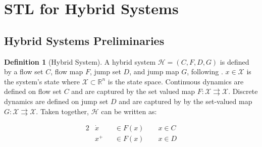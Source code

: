 \documentclass{article}
\theoremstyle{definition}
\newtheorem{definition}{Definition}[section]
\begin{document}

\section{STL for Hybrid Systems}

\subsection{Hybrid Systems Preliminaries }

\begin{definition}[Hybrid System]
    A hybrid system $\mathcal{H} = (C,F,D,G)$ is defined by a flow set $C$, flow map
    $F$, jump set $D$, and jump map $G$, following \cite{hybrid_2012}. $x\in
    \mathcal{X}$ is the system's state where $\mathcal{X}\subset\mathbb{R}^n$ is the state
    space. Continuous dynamics are defined on flow set $C$ and are captured by the set valued map
    $F:\mathcal{X}\rightrightarrows\mathcal{X}$. Discrete dynamics are
    defined on jump set $D$ and are captured by by the set-valued map
    $G:\mathcal{X}\rightrightarrows\mathcal{X}$. Taken together,
    $\mathcal{H}$ can be written as:

    \begin{alignat}{2}
        &\dot{x} &&\in F(x) \quad\quad x \in C\\
        &x^{+} &&\in F(x) \quad\quad x \in D \nonumber
    \end{alignat}

\end{definition}
\end{document}
